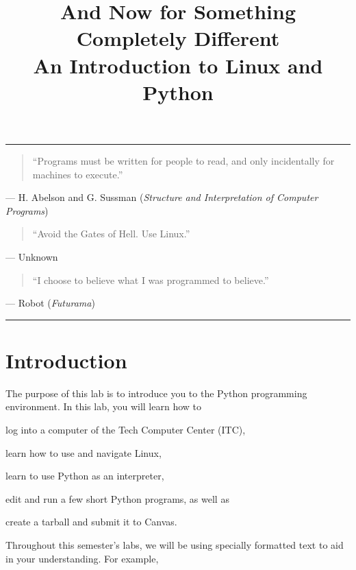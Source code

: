 \documentclass[11pt]{cselabheader}
\title{And Now for Something Completely Different\\
  {\large An Introduction to Linux and Python}}
\begin{document}
\maketitle

\hrule

\begin{quotation}
  ``Programs must be written for people to read, and only incidentally for
  machines to execute.''
\end{quotation}
\begin{flushright}
--- H. Abelson and G. Sussman (\textit{Structure and Interpretation of Computer
Programs})
\end{flushright}

\begin{quotation}
``Avoid the Gates of Hell. Use Linux.''
\end{quotation}
\begin{flushright}
--- Unknown
\end{flushright}

\begin{quotation}
``I choose to believe what I was programmed to believe.''
\end{quotation}
\begin{flushright}
  --- Robot (\textit{Futurama})
\end{flushright}

\hrule
\section{Introduction}

The purpose of this lab is to introduce you to the Python programming
environment. In this lab, you will learn how to
\begin{enumerate*}
  \item log into a computer of the Tech Computer Center (ITC),
  \item learn how to use and navigate Linux,
  \item learn to use Python as an interpreter,
  \item edit and run a few short Python programs, as well as
  \item create a tarball and submit it to Canvas.
\end{enumerate*}

Throughout this semester's labs, we will be using specially formatted text to
aid in your understanding. For example,
\end{document}
